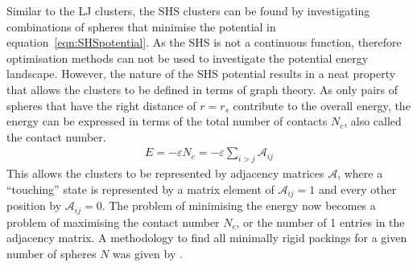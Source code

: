 Similar to the \ac{LJ} clusters, the \ac{SHS} clusters can be found by
investigating combinations of spheres that minimise the potential in
equation~\ref{eqn:SHSpotential}. As the \ac{SHS} is not a continuous function,
therefore optimisation methods can not be used to investigate the potential
energy landscape. However, the nature of the \ac{SHS} potential results in a
neat property that allows the clusters to be defined in terms of graph theory.
As only pairs of spheres that have the right distance of $r=r_s$ contribute to
the overall energy, the energy can be expressed in terms of the total number of
contacts $N_c$, also called the contact number.
%
\begin{align}
    E=-\varepsilon N_c=-\varepsilon \sum\limits_{i>j} \mathcal{A}_{ij}
\end{align}
%
This allows the clusters to be represented by adjacency matrices $\mathcal{A}$,
where a ``touching'' state is represented by a matrix element of
$\mathcal{A}_{ij}=1$ and every other position by $\mathcal{A}_{ij}=0$. The
problem of minimising the energy now becomes a problem of maximising the contact
number $N_c$, or the number of 1 entries in the adjacency matrix. A methodology
to find all minimally rigid packings for a given number of spheres $N$ was given
by
\citeauthor{Arkus_DerivingFiniteSphere_2011}\autocite{Arkus_DerivingFiniteSphere_2011}.
